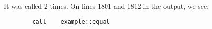 It was called 2 times. On lines 1801 and 1812 in the output, we see:
\begin{verbatim}
        call    example::equal
\end{verbatim}

